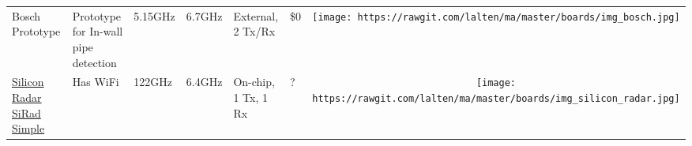 \begin{longtable}[]{@{}llllllc@{}}
\begin{minipage}[t]{0.09\columnwidth}\raggedright\strut
Bosch Prototype
\strut\end{minipage} &
\begin{minipage}[t]{0.13\columnwidth}\raggedright\strut
Prototype for In-wall pipe detection
\strut\end{minipage} &
\begin{minipage}[t]{0.09\columnwidth}\raggedright\strut
5.15GHz
\strut\end{minipage} &
\begin{minipage}[t]{0.11\columnwidth}\raggedright\strut
6.7GHz
\strut\end{minipage} &
\begin{minipage}[t]{0.10\columnwidth}\raggedright\strut
External, 2 Tx/Rx
\strut\end{minipage} &
\begin{minipage}[t]{0.15\columnwidth}\raggedright\strut
\$0
\strut\end{minipage} &
\begin{minipage}[t]{0.10\columnwidth}\centering\strut
\texttt{[image: https://rawgit.com/lalten/ma/master/boards/img\_bosch.jpg]}
\strut\end{minipage}\tabularnewline

\begin{minipage}[t]{0.09\columnwidth}\raggedright\strut
	\href{http://www.siliconradar.de/evalkits_e.html}{Silicon Radar SiRad Simple}
\strut\end{minipage} &
\begin{minipage}[t]{0.13\columnwidth}\raggedright\strut
Has WiFi
\strut\end{minipage} &
\begin{minipage}[t]{0.09\columnwidth}\raggedright\strut
122GHz
\strut\end{minipage} &
\begin{minipage}[t]{0.11\columnwidth}\raggedright\strut
6.4GHz
\strut\end{minipage} &
\begin{minipage}[t]{0.10\columnwidth}\raggedright\strut
On-chip, 1 Tx, 1 Rx
\strut\end{minipage} &
\begin{minipage}[t]{0.15\columnwidth}\raggedright\strut
?
\strut\end{minipage} &
\begin{minipage}[t]{0.10\columnwidth}\centering\strut
\texttt{[image: https://rawgit.com/lalten/ma/master/boards/img\_silicon\_radar.jpg]}


\end{minipage}
\end{longtable}
